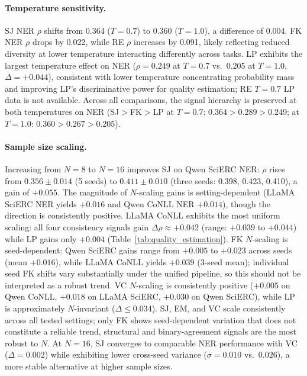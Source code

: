\paragraph{Temperature sensitivity.}
SJ NER $\rho$ shifts from 0.364 ($T{=}0.7$) to 0.360 ($T{=}1.0$), a difference of 0.004.
FK NER $\rho$ drops by 0.022, while RE $\rho$ increases by 0.091, likely reflecting reduced diversity at lower temperature interacting differently across tasks.
LP exhibits the largest temperature effect on NER ($\rho{=}0.249$ at $T{=}0.7$ vs.\ $0.205$ at $T{=}1.0$, $\Delta{=}{+}0.044$), consistent with lower temperature concentrating probability mass and improving LP's discriminative power for quality estimation; RE $T{=}0.7$ LP data is not available.
Across all comparisons, the signal hierarchy is preserved at both temperatures on NER (SJ${>}$FK${>}$LP at $T{=}0.7$: $0.364{>}0.289{>}0.249$; at $T{=}1.0$: $0.360{>}0.267{>}0.205$).

\paragraph{Sample size scaling.}
Increasing from $N{=}8$ to $N{=}16$ improves SJ on Qwen SciERC NER: $\rho$ rises from $0.356{\pm}0.014$ (5 seeds) to $0.411{\pm}0.010$ (three seeds: 0.398, 0.423, 0.410), a gain of $+0.055$.
The magnitude of $N$-scaling gains is setting-dependent (LLaMA SciERC NER yields $+0.016$ and Qwen CoNLL NER $+0.014$), though the direction is consistently positive.
LLaMA CoNLL exhibits the most uniform scaling: all four consistency signals gain $\Delta\rho{\approx}{+}0.042$ (range: $+0.039$ to $+0.044$) while LP gains only $+0.004$ (Table~\ref{tab:quality_estimation}).
FK $N$-scaling is seed-dependent: Qwen SciERC gains range from $+0.005$ to $+0.023$ across seeds (mean $+0.016$), while LLaMA CoNLL yields $+0.039$ (3-seed mean); individual seed FK shifts vary substantially under the unified pipeline, so this should not be interpreted as a robust trend.
VC $N$-scaling is consistently positive ($+0.005$ on Qwen CoNLL, $+0.018$ on LLaMA SciERC, $+0.030$ on Qwen SciERC), while LP is approximately $N$-invariant ($\Delta{\leq}0.034$).
SJ, EM, and VC scale consistently across all tested settings; only FK shows seed-dependent variation that does not constitute a reliable trend, structural and binary-agreement signals are the most robust to $N$.
At $N{=}16$, SJ converges to comparable NER performance with VC ($\Delta{=}0.002$) while exhibiting lower cross-seed variance ($\sigma{=}0.010$ vs.\ $0.026$), a more stable alternative at higher sample sizes.

